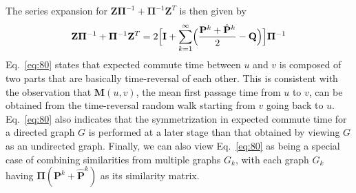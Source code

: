 The series expansion for $\mathbf{Z}\bm{\Pi}^{-1} +
\bm{\Pi}^{-1}\mathbf{Z}^{T}$ is then given by
\begin{equation}
  \label{eq:80}
  \mathbf{Z}\bm{\Pi}^{-1} + \bm{\Pi}^{-1}\mathbf{Z}^{T} = 
  2 \Bigl[ \mathbf{I} +
  \sum_{k=1}^{\infty}\Bigl(\frac{\mathbf{P}^{k} + \hat{\mathbf{P}}^{k}}{2}
  - \mathbf{Q}\Bigr)\Bigr] \bm{\Pi}^{-1}
\end{equation}
Eq.~\eqref{eq:80} states that expected commute time between $u$ and
$v$ is composed of two parts that are basically time-reversal of each
other. This is consistent with the observation that $\mathbf{M}(u,v)$,
the mean first passage time from $u$ to $v$, can be obtained from the
time-reversal random walk starting from $v$ going back to
$u$. Eq.~\eqref{eq:80} also indicates that the symmetrization in
expected commute time for a directed graph $G$ is performed at a later
stage than that obtained by viewing $G$ as an undirected
graph. Finally, we can also view Eq.~\eqref{eq:80} as being a special
case of combining similarities from multiple graphs $G_k$, with each
graph $G_k$ having $\bm{\Pi}(\mathbf{P}^{k} + \hat{\mathbf{P}}^{k})$
as its similarity matrix.

